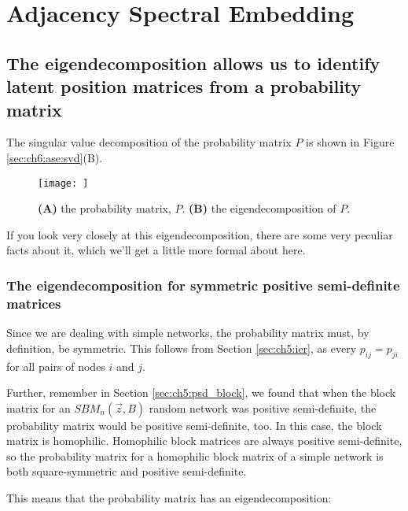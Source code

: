 \section{Adjacency Spectral Embedding}
\label{app:ch13:ase}

\subsection{The eigendecomposition allows us to identify latent position matrices from a probability matrix}

The singular value decomposition of the probability matrix $P$ is shown in Figure \ref{sec:ch6:ase:svd}(B).

\begin{figure}
    \centering
    \texttt{[image: ]}
    \caption[\texttt{svd} of a homophilic probability matrix]{\textbf{(A)} the probability matrix, $P$. \textbf{(B)} the eigendecomposition of $P$.}
    \label{fig:ch6:ase:svd}
\end{figure}

If you look very closely at this eigendecomposition, there are some very peculiar facts about it, which we'll get a little more formal about here.

\subsubsection{The eigendecomposition for symmetric positive semi-definite matrices}

Since we are dealing with simple networks, the probability matrix must, by definition, be symmetric. This follows from Section \ref{sec:ch5:ier}, as every $p_{ij} = p_{ji}$ for all pairs of nodes $i$ and $j$. 

Further, remember in Section \ref{sec:ch5:psd_block}, we found that when the block matrix for an $SBM_n(\vec z, B)$ random network was positive semi-definite, the probability matrix would be positive semi-definite, too. In this case, the block matrix is homophilic. Homophilic block matrices are always positive semi-definite, so the probability matrix for a homophilic block matrix of a simple network is both square-symmetric and positive semi-definite.

This means that the probability matrix has an eigendecomposition:

